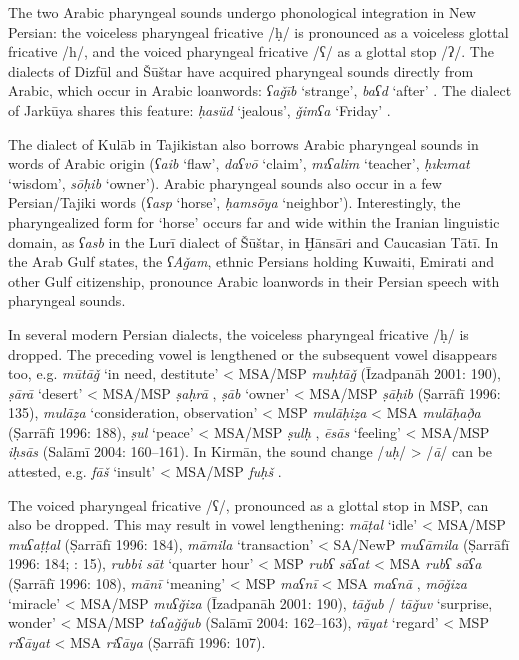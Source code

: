 \documentclass[output=paper]{langsci/langscibook}
\begin{document}

The two Arabic pharyngeal sounds undergo phonological integration in New Persian: the voiceless pharyngeal fricative /ḥ/ is pronounced as a voiceless glottal fricative /h/, and the voiced pharyngeal fricative /ʕ/ as a glottal stop /ʔ/. The dialects of Dizfūl and Šūštar have acquired pharyngeal sounds directly from Arabic, which occur in Arabic loanwords: \textit{ʕaǧīb} ‘strange’, \textit{baʕd} ‘after’ \citep{MacKinnon2015}. The dialect of Jarkūya shares this feature: \textit{ḥasüd} ‘jealous’, \textit{ǧimʕa} ‘Friday’ \citep{Borjian2008}.

The dialect of Kulāb in Tajikistan also borrows Arabic pharyngeal sounds in words of Arabic origin (\textit{ʕaib} ‘flaw’, \textit{daʕvō} ‘claim’, \textit{mıʕalim} ‘teacher’, \textit{ḥıkımat} ‘wisdom’, \textit{sōḥib} ‘owner’). Arabic pharyngeal sounds also occur in a few Persian/Tajiki words (\textit{ʕasp} ‘horse’, \textit{ḥamsōya} ‘neighbor’). Interestingly, the pharyngealized form for ‘horse’ occurs far and wide within the Iranian linguistic domain, as \textit{ʕasb} in the Lurī dialect of Šūštar, in Ḫānsāri and Caucasian Tātī. In the Arab Gulf states, the \textit{ʕAǧam}, ethnic Persians holding Kuwaiti, Emirati and other Gulf citizenship, pronounce Arabic loanwords in their Persian speech with pharyngeal sounds.


In several modern Persian dialects, the voiceless pharyngeal fricative /ḥ/ is dropped. The preceding vowel is lengthened or the subsequent vowel disappears too, e.g. \textit{mūtāǧ} ‘in need, destitute’ < MSA/MSP \textit{muḥtāǧ} (Īzadpanāh 2001: 190), \textit{ṣārā} ‘desert’ < MSA/MSP \textit{ṣaḥrā} \citep[15]{Sarlak2002}, \textit{ṣāb} ‘owner’ < MSA/MSP \textit{ṣāḥib} (Ṣarrāfī 1996: 135), \textit{mulāẓa} ‘consideration, observation’ < MSP \textit{mulāḥiẓa} < MSA \textit{mulāḥað̣a} (Ṣarrāfī 1996: 188), \textit{ṣul} ‘peace’ < MSA/MSP \textit{ṣulḥ} \citep{Stilo2001}, \textit{ēsās} ‘feeling’ < MSA/MSP \textit{iḥsās} (Salāmī 2004: 160–161). In Kirmān, the sound change /\textit{uḥ}/ > /\textit{ā}/ can be attested, e.g. \textit{fāš} ‘insult’ < MSA/MSP \textit{fuḥš} \citep{Borjian2017}.

The voiced pharyngeal fricative /ʕ/, pronounced as a glottal stop in MSP, can also be dropped. This may result in vowel lengthening: \textit{māṭal} ‘idle’ < MSA/MSP \textit{muʕaṭṭal} (Ṣarrāfī 1996: 184), \textit{māmila} ‘transaction’ < SA/NewP \textit{muʕāmila} (Ṣarrāfī 1996: 184; \citealt{Sarlak2002}: 15), \textit{rubbi} \textit{sāt} ‘quarter hour’ < MSP \textit{rubʕ} \textit{sāʕat} < MSA \textit{rubʕ} \textit{sāʕa} (Ṣarrāfī 1996: 108), \textit{mānī} ‘meaning’ < MSP \textit{maʕnī} < MSA \textit{maʕnā} \citep[15]{Sarlak2002}, \textit{mōǧiza} ‘miracle’ < MSA/MSP \textit{muʕǧiza} (Īzadpanāh 2001: 190), \textit{tāǧub} / \textit{tāǧuv} ‘surprise, wonder’ < MSA/MSP \textit{taʕaǧǧub} (Salāmī 2004: 162–163), \textit{rāyat} ‘regard’ < MSP \textit{riʕāyat} < MSA \textit{riʕāya} (Ṣarrāfī 1996: 107).
\end{document}
